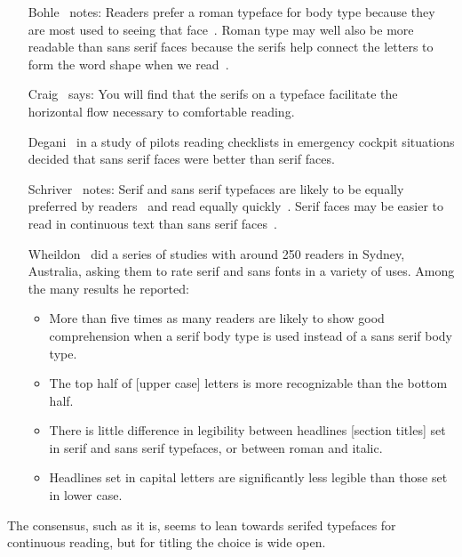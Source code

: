 \documentclass[10pt,letterpaper]{memoir}
\begin{document}
\begin{itemize}
\def\makelabel#1{\noindent #1}
\item[Bohle~\cite{BOHLE90}] notes: Readers prefer a roman typeface for body
  type because they are most used to seeing that face~\cite{REHE72}.
  Roman type may well also be more readable than sans serif faces because
  the serifs help connect the letters to form the word shape when
  we read~\cite{REHE72}.

\item[Craig~\cite{CRAIG92}] says: You will find that the serifs on a typeface
  facilitate the horizontal flow necessary to comfortable reading.

\item[Degani~\cite{DEGANI92}] in a study of pilots reading checklists
  in emergency cockpit situations decided that sans serif faces were
  better than serif faces.

\item[Schriver~\cite{SCHRIVER97}] notes: Serif and sans serif typefaces 
  are likely to be equally preferred by 
  readers~\cite{HARTLEY83,TINKER63}
  and read equally quickly~\cite{GOULD87,HARTLEY83,ZACHRISSOM69}.
  Serif faces may be easier to read in continuous text than sans
  serif faces~\cite{BURT59,HVISTENDAHL75,ROBINSON71,WHEILDON95}.

\item[Wheildon~\cite{WHEILDON95}] did a series of studies with around
250 readers in Sydney, Australia, asking them to rate serif and sans fonts
in a variety of uses. Among the many results he reported:
\begin{itemize}
  \item More than five times as many readers are likely to show good
  comprehension when a serif body type is used instead of a sans serif
  body type.
  \item The top half of [upper case] letters is more recognizable than
  the bottom half.
  \item There is little difference in legibility between headlines
  [section titles] set in serif and sans serif typefaces, or between
  roman and italic.
  \item Headlines set in capital letters are significantly less legible
  than those set in lower case.
\end{itemize}

\end{itemize}

    The consensus, such as it is, seems to lean towards serifed
typefaces for continuous reading, but for titling the choice is
wide open.
\end{document}
